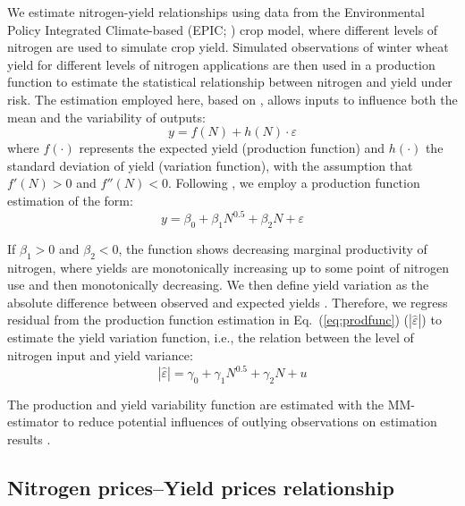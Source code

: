 \documentclass[12pt,a4paper]{article}
\begin{document}
We estimate nitrogen-yield relationships using data from the Environmental Policy Integrated Climate-based (EPIC; \citealp{Williams1995}) crop model, where different levels of nitrogen are used to simulate crop yield. Simulated observations of winter wheat yield for different levels of nitrogen applications are then used in a production function to estimate the statistical relationship between nitrogen and yield under risk. The estimation employed here, based on \citet{JustPope1978, JustPope1979}, allows inputs to influence both the mean and the variability of outputs:
\begin{equation}
y = f(N) + h(N) \cdot \varepsilon
\label{eq:justpope}
\end{equation}
where $f(\cdot)$ represents the expected yield (production function) and $h(\cdot)$ the standard deviation of yield (variation function), with the assumption that $f'(N) > 0$ and $f''(N) < 0$. Following \citet{FingerHediger2008}, we employ a production function estimation of the form:
\begin{equation}
y = \beta_0 + \beta_1 N^{0.5} + \beta_2 N + \varepsilon
\label{eq:prodfunc}
\end{equation}

If $\beta_1 > 0$ and $\beta_2 < 0$, the function shows decreasing marginal productivity of nitrogen, where yields are monotonically increasing up to some point of nitrogen use and then monotonically decreasing. We then define yield variation as the absolute difference between observed and expected yields \citep{FingerSchmid2008}. Therefore, we regress residual from the production function estimation in Eq.~(\ref{eq:prodfunc}) ($|\hat{\varepsilon}|$) to estimate the yield variation function, i.e., the relation between the level of nitrogen input and yield variance:
\begin{equation}
|\hat{\varepsilon}| = \gamma_0 + \gamma_1 N^{0.5} + \gamma_2 N + u
\label{eq:varfunc}
\end{equation}

The production and yield variability function are estimated with the MM-estimator \citep{Yohai1987} to reduce potential influences of outlying observations on estimation results \citep{Finger2013}.

\subsection{Nitrogen prices--Yield prices relationship}
\end{document}
